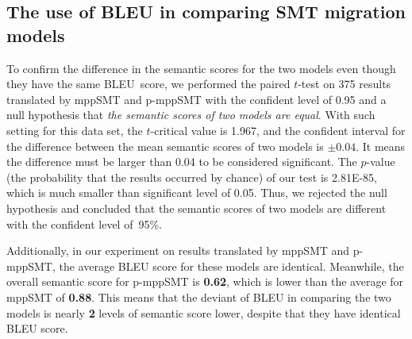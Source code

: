\subsection{The use of BLEU in comparing SMT migration models}

To confirm the difference in the semantic scores for the two
models even though they have the same BLEU~score, we performed the
paired $t$-test\cite{geek_2015} on 375 results translated by mppSMT and 
p-mppSMT with the confident level of
0.95 and a null hypothesis that {\em the semantic scores of two models
are equal}. With such setting for this data set, the $t$-critical value is 1.967, 
and the confident interval for the difference between the mean semantic scores 
of two models is $\pm0.04$. It means the difference must be larger than 0.04 to 
be considered significant. The $p$-value (the probability 
that the results occurred by chance) of our test is 2.81E-85, which is much
smaller than significant level of 0.05. Thus, we rejected the null hypothesis and concluded
that the semantic scores of two models are different with the confident
level of~95\%.

Additionally, in our experiment on results translated by mppSMT and 
p-mppSMT, the average BLEU score for these models are
identical. Meanwhile, the overall semantic score for p-mppSMT is
\textbf{0.62}, which is lower than the average for mppSMT of
\textbf{0.88}. This means that the deviant of BLEU in comparing the
two models is nearly \textbf{2} levels of semantic score lower,
despite that they have identical BLEU score.



